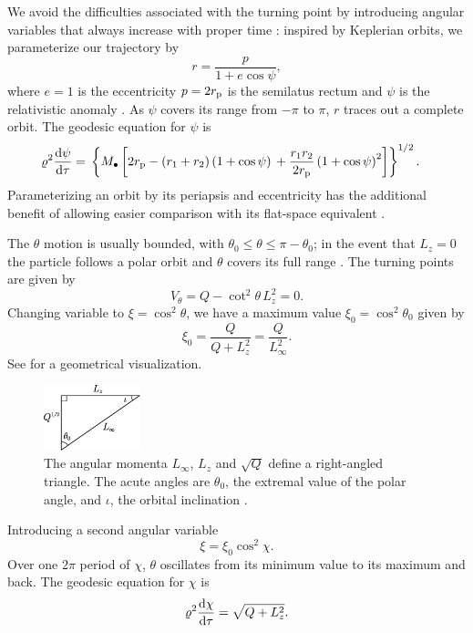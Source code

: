 We avoid the difficulties associated with the turning point by introducing angular variables that always increase with proper time \citep{Drasco2004}: inspired by Keplerian orbits, we parameterize our trajectory by
\begin{equation}
r = \dfrac{p}{1+e\cos\psi},
\end{equation}
where $e = 1$ is the eccentricity $p = 2r_\mathrm{p}$ is the semilatus rectum and $\psi$ is the relativistic anomaly \citep{Darwin1961}. As $\psi$ covers its range from $-\pi$ to $\pi$, $r$ traces out a complete orbit. The geodesic equation for $\psi$ is
\begin{align}
\varrho^2 \diff{\psi}{\tau} = {} & \left\{M_\bullet\left[2r\sub{p} - \left(r_1 + r_2\right)\left(1 + \cos\psi\right) \vphantom{\dfrac{r_1 r_2}{2r\sub{p}}} +  \dfrac{r_1 r_2}{2r\sub{p}}\left(1 + \cos\psi\right)^2\right]\right\}^{1/2}.
\end{align}
Parameterizing an orbit by its periapsis and eccentricity has the additional benefit of allowing easier comparison with its flat-space equivalent \citep{Gair2005}.

The $\theta$ motion is usually bounded, with $\theta_0 \leq \theta \leq \pi - \theta_0$; in the event that $L_z = 0$ the particle follows a polar orbit and $\theta$ covers its full range \citep{Wilkins1972}. The turning points are given by
\begin{equation}
V_\theta = Q - \cot^2\theta\, L_z^2 = 0.
\end{equation}
Changing variable to $\xi = \cos^2\theta$, we have a maximum value $\xi_0 = \cos^2\theta_0$ given by
\begin{equation}
\xi_0 = \dfrac{Q}{Q+L_z^2} = \dfrac{Q}{L_\infty^2}.
\label{eq:theta_0}
\end{equation}
See  for a geometrical visualization.
\begin{figure}
\centering
\includegraphics[width=0.25\textwidth]{./images/Triangle}
    \caption{The angular momenta $L_\infty$, $L_z$ and $\sqrt{Q}$ define a right-angled triangle. The acute angles are $\theta_0$, the extremal value of the polar angle, and $\iota$, the orbital inclination \citep{Ryan1996,Glampedakis2002}.}
    \label{fig:L_triangle}
\end{figure}
Introducing a second angular variable \citep{Hughes2000,Drasco2004}
\begin{equation}
\xi = \xi_0\cos^2\chi.
\end{equation}
Over one $2\pi$ period of $\chi$, $\theta$ oscillates from its minimum value to its maximum and back. The geodesic equation for $\chi$ is
\begin{equation}
\varrho^2\dfrac{\mathrm{d} {\chi}}{\mathrm{d} {\tau}} = \sqrt{Q + L_z^2}.
\end{equation}

